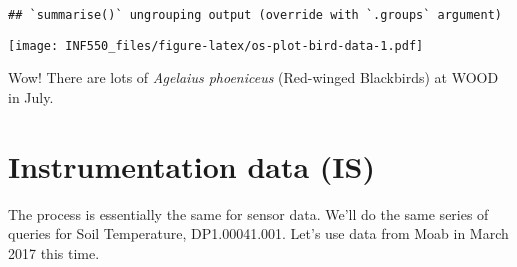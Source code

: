 \documentclass[]{book}
\newenvironment{Shaded}{\begin{snugshade}}{\end{snugshade}}
\newcommand{\CommentTok}[1]{\textcolor[rgb]{0.56,0.35,0.01}{\textit{#1}}}
\newcommand{\DataTypeTok}[1]{\textcolor[rgb]{0.13,0.29,0.53}{#1}}
\newcommand{\DecValTok}[1]{\textcolor[rgb]{0.00,0.00,0.81}{#1}}
\newcommand{\FloatTok}[1]{\textcolor[rgb]{0.00,0.00,0.81}{#1}}
\newcommand{\KeywordTok}[1]{\textcolor[rgb]{0.13,0.29,0.53}{\textbf{#1}}}
\newcommand{\NormalTok}[1]{#1}
\newcommand{\OperatorTok}[1]{\textcolor[rgb]{0.81,0.36,0.00}{\textbf{#1}}}
\newcommand{\StringTok}[1]{\textcolor[rgb]{0.31,0.60,0.02}{#1}}
\begin{document}
\begin{verbatim}
## `summarise()` ungrouping output (override with `.groups` argument)
\end{verbatim}

\begin{Shaded}
\end{Shaded}

\texttt{[image: INF550\_files/figure-latex/os-plot-bird-data-1.pdf]}

Wow! There are lots of \emph{Agelaius phoeniceus} (Red-winged Blackbirds) at WOOD in July.

\hypertarget{instrumentation-data-is}{%
\section{Instrumentation data (IS)}\label{instrumentation-data-is}}

The process is essentially the same for sensor data. We'll do the same series of
queries for Soil Temperature, DP1.00041.001. Let's use data from Moab in March
2017 this time.
\end{document}
